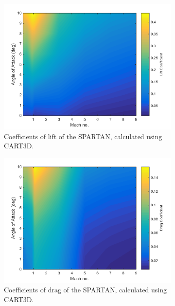 \begin{figure}[ht]
	\begin{subfigure}{.5\textwidth}
		\centering
		\includegraphics[width=0.99\linewidth]{figures/3_vehicle_design/Cl}
		\caption{Coefficients of lift of the SPARTAN, calculated using CART3D.}
		\label{fig:Cl}
	\end{subfigure}
	\begin{subfigure}{.5\textwidth}
		\centering
		\includegraphics[width=0.99\linewidth]{figures/3_vehicle_design/Cd}
		\caption{Coefficients of drag of the SPARTAN, calculated using CART3D.}
		\label{fig:Cd}
	\end{subfigure}
	\begin{subfigure}{.5\textwidth}
		\centering

\end{subfigure}
\end{figure}
